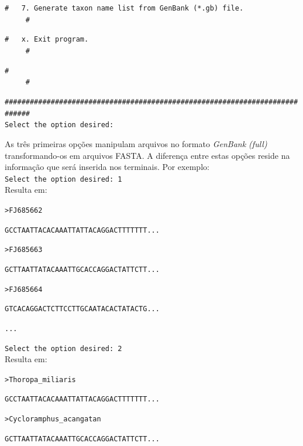 \begin{refsection}
\noindent\texttt{\#~~~7.~Generate~taxon~name~list~from~GenBank~(*.gb)~file.~~~~~~~~~~~~~~~~~~\#}

\noindent\texttt{\#~~~x.~Exit~program.~~~~~~~~~~~~~~~~~~~~~~~~~~~~~~~~~~~~~~~~~~~~~~~~~~~~~~~\#}

\noindent\texttt{\#~~~~~~~~~~~~~~~~~~~~~~~~~~~~~~~~~~~~~~~~~~~~~~~~~~~~~~~~~~~~~~~~~~~~~~~~~~\#}

\noindent\texttt{\#\#\#\#\#\#\#\#\#\#\#\#\#\#\#\#\#\#\#\#\#\#\#\#\#\#\#\#\#\#\#\#\#\#\#\#\#\#\#\#\#\#\#\#\#\#\#\#\#\#\#\#\#\#\#\#\#\#\#\#\#\#\#\#\#\#\#\#\#\#\#\#\#\#\#\#}\\

\noindent\texttt{Select~the~option~desired:}

\normalsize

As três primeiras opções manipulam arquivos no formato \textit{GenBank (full)} transformando-os em arquivos FASTA. A diferença entre estas opções reside na informação que será inserida nos terminais. Por exemplo:\\

\texttt{Select the option desired: 1}\\

Resulta em:\\

\scriptsize

\noindent\texttt{>FJ685662}

\noindent\texttt{GCCTAATTACACAAATTATTACAGGACTTTTTTT...}

\noindent\texttt{>FJ685663}

\noindent\texttt{GCTTAATTATACAAATTGCACCAGGACTATTCTT...}

\noindent\texttt{>FJ685664}

\noindent\texttt{GTCACAGGACTCTTCCTTGCAATACACTATACTG...}

\noindent\texttt{...}\\

\normalsize


\texttt{Select the option desired: 2}\\

Resulta em:\\

\scriptsize

\noindent\texttt{>Thoropa\_miliaris}

\noindent\texttt{GCCTAATTACACAAATTATTACAGGACTTTTTTT...}

\noindent\texttt{>Cycloramphus\_acangatan}

\noindent\texttt{GCTTAATTATACAAATTGCACCAGGACTATTCTT...}


\end{refsection}
